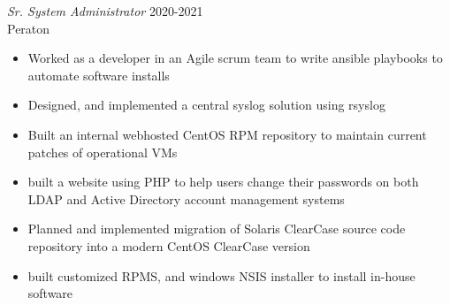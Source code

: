 \documentclass[margin, 10pt]{res} %
\begin{document}
\begin{resume}
{\sl Sr. System Administrator } \hfill 2020-2021 \\
Peraton
\begin{itemize}
  \item Worked as a developer in an Agile scrum team to write ansible playbooks to automate software installs
  \item Designed, and implemented a central syslog solution using rsyslog
  \item Built an internal webhosted CentOS RPM repository to maintain current patches of operational VMs
  \item built a website using PHP to help users change their passwords on both LDAP and Active Directory account management systems
  \item Planned and implemented migration of Solaris ClearCase source code repository into a modern CentOS ClearCase version
  \item built customized RPMS, and windows NSIS installer to install in-house software
\end{itemize}


\end{resume}
\end{document}
